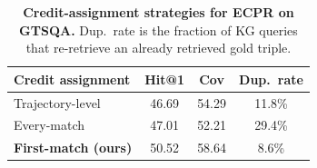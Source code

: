 \begin{table}[t]
\centering
\small
\begin{tabular}{lccc}
\toprule
\textbf{Credit assignment} & \textbf{Hit@1} & \textbf{Cov} & \textbf{Dup.\ rate} \\
\midrule
Trajectory-level & 46.69 & 54.29 & 11.8\% \\
Every-match      & 47.01 & 52.21 & 29.4\% \\
\rowcolor{lightblue}
\textbf{First-match (ours)} & 50.52 & 58.64 & 8.6\% \\
\bottomrule
\end{tabular}
\caption{\textbf{Credit-assignment strategies for ECPR on GTSQA.} Dup.\ rate is the fraction of KG queries that re-retrieve an already retrieved gold triple.}
\label{tab:credit_assign}
\vspace{-5mm}
\end{table}
